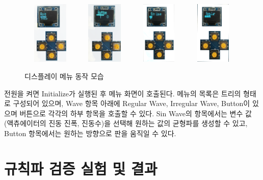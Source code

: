\begin{figure}[H]
            \includegraphics[trim=10 1050 100 0, clip, width=0.24\textwidth, height=3cm]{images/OLED1.png} 
            \includegraphics[trim=100 1550 100 0, clip, width=0.24\textwidth, height=3cm]{images/OLED2.png}
            \includegraphics[trim=30 950 150 0,clip, width=0.24\textwidth, height=3cm]{images/OLED3.png}
            \includegraphics[trim=30 950 100 0, clip, width=0.24\textwidth, height=3cm]{images/OLED4.png}
        \caption{디스플레이 메뉴 동작 모습}
        \label{Oled}   
    \end{figure} 
    
전원을 켜면 Initialize가 실행된 후 메뉴 화면이 호출된다. 메뉴의 목록은 트리의 형태로 구성되어 있으며, Wave 항목 아래에 Regular Wave, Irregular Wave, Button이 있으며 버튼으로 각각의 하부 항목을 호출할 수 있다. Sin Wave의 항목에서는 변수 값 (액츄에이터의 진동 진폭, 진동수)을 선택해 원하는 값의 균형파를 생성할 수 있고, Button 항목에서는 원하는 방향으로 판을 움직일 수 있다.

\section{규칙파 검증 실험 및 결과}

